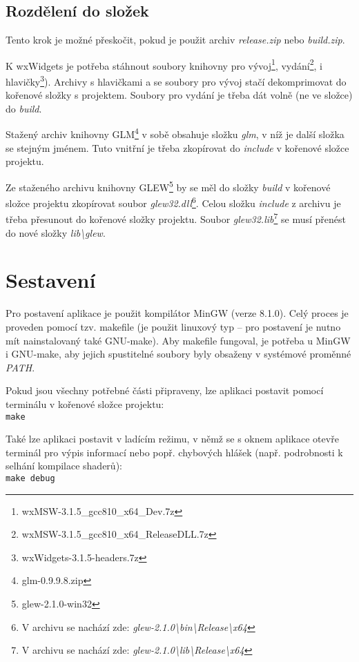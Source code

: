 \documentclass[a4paper, 11pt]{report}
\begin{document}
\subsection{\label{libs}Rozdělení do složek}
Tento krok je možné přeskočit, pokud je použit archiv \emph{release.zip} nebo \emph{build.zip}.

K wxWidgets je potřeba stáhnout soubory knihovny pro vývoj\footnote{wxMSW-3.1.5\_gcc810\_x64\_Dev.7z}, vydání\footnote{wxMSW-3.1.5\_gcc810\_x64\_ReleaseDLL.7z}, i hlavičky\footnote{wxWidgets-3.1.5-headers.7z}). Archivy s hlavičkami a se soubory pro vývoj stačí dekomprimovat do kořenové složky s projektem. Soubory pro vydání je třeba dát volně (ne ve složce) do \emph{build}.

Stažený archiv knihovny GLM\footnote{glm-0.9.9.8.zip} v sobě obsahuje složku \emph{glm}, v níž je další složka se stejným jménem. Tuto vnitřní je třeba zkopírovat do \emph{include} v kořenové složce projektu.

Ze staženého archivu knihovny GLEW\footnote{glew-2.1.0-win32} by se měl do složky \emph{build} v kořenové složce projektu zkopírovat soubor \emph{glew32.dll}\footnote{V archivu se nachází zde: \emph{glew-2.1.0\textbackslash bin\textbackslash Release\textbackslash x64}}. Celou složku \emph{include} z archivu je třeba přesunout do kořenové složky projektu. Soubor \emph{glew32.lib}\footnote{V archivu se nachází zde: \emph{glew-2.1.0\textbackslash lib\textbackslash Release\textbackslash x64}} se musí přenést do nové složky \emph{lib\textbackslash glew}.

\section{Sestavení}
Pro postavení aplikace je použit kompilátor MinGW (verze 8.1.0). Celý proces je proveden pomocí tzv. makefile (je použit linuxový typ -- pro postavení je nutno mít nainstalovaný také GNU-make). Aby makefile fungoval, je potřeba u MinGW i GNU-make, aby jejich spustitelné soubory byly obsaženy v systémové proměnné \emph{PATH}.

Pokud jsou všechny potřebné části připraveny, lze aplikaci postavit pomocí terminálu v kořenové složce projektu:\\
\texttt{make}

Také lze aplikaci postavit v ladícím režimu, v němž se s oknem aplikace otevře terminál pro výpis informací nebo popř. chybových hlášek (např. podrobnosti k selhání kompilace shaderů):\\
\texttt{make debug}
\end{document}
